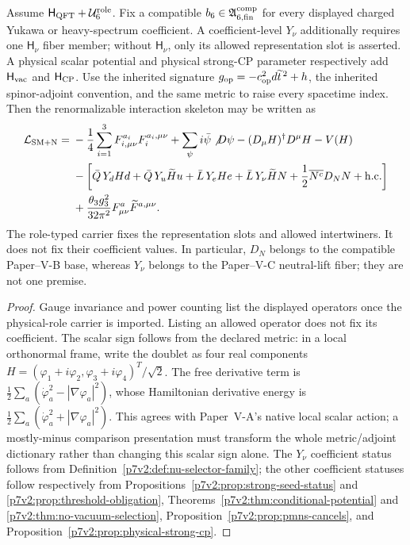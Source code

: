 \documentclass[11pt,a4paper]{article}
\newcommand{\Hqft}{\mathsf{H}_{\rm QFT}}
\newcommand{\Hvac}{\mathsf{H}_{\rm vac}}
\newcommand{\Hcp}{\mathsf{H}_{\rm CP}}
\newcommand{\Hnu}{\mathsf{H}_{\nu}}
\newcommand{\YN}{Y_\nu}
\newcommand{\Urole}{\mathcal U_6^{\rm role}}
\newcommand{\Acompsix}{\mathfrak A_{6,{\rm fin}}^{\rm comp}}
\begin{document}
\begin{proposition}
\label{p7v2:prop:lagrangian-dictionary}
Assume \(\Hqft+\Urole\).  Fix a compatible
\(b_6\in\Acompsix\) for every displayed charged Yukawa or heavy-spectrum
coefficient.  A coefficient-level \(Y_\nu\) additionally requires one
\(\Hnu\) fiber member; without \(\Hnu\), only its allowed representation slot
is asserted.  A physical scalar potential and physical strong-CP parameter
respectively add \(\Hvac\) and \(\Hcp\).
Use the inherited signature
\(g_{\rm op}=-c_{\rm op}^2d\widetilde t^{\,2}+h\), the inherited
spinor-adjoint convention, and the same metric to raise every spacetime
index.  Then the renormalizable interaction skeleton may be written as
\begin{align}
\label{p7v2:eq:sm-lagrangian-skeleton}
 \mathcal L_{\rm SM+N}
 ={}&
 -\frac14\sum_{i=1}^{3}F_{i,\mu\nu}^{a_i}F_i^{a_i,\mu\nu}
 +\sum_\psi i\bar\psi\slashed D\psi
 -(D_\mu H)^\dagger D^\mu H
 -V(H)
 \nonumber\\
 &-\left[
   \bar Q\,Y_d H d
  +\bar Q\,Y_u\widetilde H u
  +\bar L\,Y_e H e
  +\bar L\,\YN\widetilde H N
  +\frac12\overline{N^c}D_NN
  +{\rm h.c.}
 \right]
 \nonumber\\
 &+\frac{\theta_3g_3^2}{32\pi^2}
   F^a_{\mu\nu}\widetilde F^{a,\mu\nu}.
\end{align}
The role-typed carrier fixes the representation slots and allowed
intertwiners.  It does not fix their coefficient values.  In particular,
\(D_N\) belongs to the compatible Paper--V-B base, whereas \(\YN\) belongs to
the Paper--V-C neutral-lift fiber; they are not one premise.
\end{proposition}

\begin{proof}
Gauge invariance and power counting list the displayed operators once the
physical-role carrier is imported.  Listing an allowed operator does not fix
its coefficient.  The scalar sign follows from the declared metric: in a
local orthonormal frame, write the doublet as four real components
\(H=(\varphi_1+i\varphi_2,\varphi_3+i\varphi_4)^T/\sqrt2\).
The free derivative term is
\(\frac12\sum_a(\dot\varphi_a^2-|\nabla\varphi_a|^2)\),
whose Hamiltonian derivative energy is
\(\frac12\sum_a(\dot\varphi_a^2+|\nabla\varphi_a|^2)\).
This agrees with Paper~V-A's native local scalar action; a mostly-minus
comparison presentation must transform the whole metric/adjoint dictionary
rather than changing this scalar sign alone.
The \(Y_\nu\) coefficient status follows from
Definition~\ref{p7v2:def:nu-selector-family}; the other coefficient statuses
follow respectively from
Propositions~\ref{p7v2:prop:strong-seed-status} and
\ref{p7v2:prop:threshold-obligation},
Theorems~\ref{p7v2:thm:conditional-potential} and
\ref{p7v2:thm:no-vacuum-selection},
Proposition~\ref{p7v2:prop:pmns-cancels}, and
Proposition~\ref{p7v2:prop:physical-strong-cp}.
\end{proof}
\end{document}
